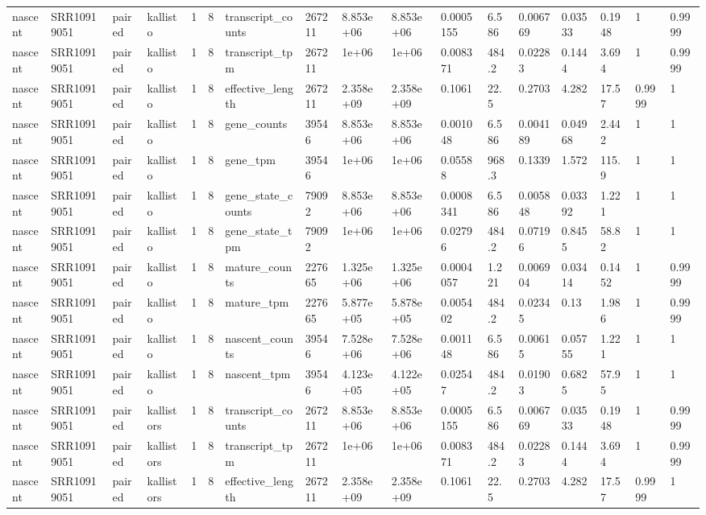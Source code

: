 \begin{tabular}{lllllllllllllllll}
nascent & SRR10919051 & paired & kallisto & 1 & 8 & transcript\_counts & 267211 & 8.853e+06 & 8.853e+06 & 0.0005155 & 6.586 & 0.006769 & 0.03533 & 0.1948 & 1 & 0.9999 \\
nascent & SRR10919051 & paired & kallisto & 1 & 8 & transcript\_tpm & 267211 & 1e+06 & 1e+06 & 0.008371 & 484.2 & 0.02283 & 0.1444 & 3.694 & 1 & 0.9999 \\
nascent & SRR10919051 & paired & kallisto & 1 & 8 & effective\_length & 267211 & 2.358e+09 & 2.358e+09 & 0.1061 & 22.5 & 0.2703 & 4.282 & 17.57 & 0.9999 & 1 \\
nascent & SRR10919051 & paired & kallisto & 1 & 8 & gene\_counts & 39546 & 8.853e+06 & 8.853e+06 & 0.001048 & 6.586 & 0.004189 & 0.04968 & 2.442 & 1 & 1 \\
nascent & SRR10919051 & paired & kallisto & 1 & 8 & gene\_tpm & 39546 & 1e+06 & 1e+06 & 0.05588 & 968.3 & 0.1339 & 1.572 & 115.9 & 1 & 1 \\
nascent & SRR10919051 & paired & kallisto & 1 & 8 & gene\_state\_counts & 79092 & 8.853e+06 & 8.853e+06 & 0.0008341 & 6.586 & 0.005848 & 0.03392 & 1.221 & 1 & 1 \\
nascent & SRR10919051 & paired & kallisto & 1 & 8 & gene\_state\_tpm & 79092 & 1e+06 & 1e+06 & 0.02796 & 484.2 & 0.07196 & 0.8455 & 58.82 & 1 & 1 \\
nascent & SRR10919051 & paired & kallisto & 1 & 8 & mature\_counts & 227665 & 1.325e+06 & 1.325e+06 & 0.0004057 & 1.221 & 0.006904 & 0.03414 & 0.1452 & 1 & 0.9999 \\
nascent & SRR10919051 & paired & kallisto & 1 & 8 & mature\_tpm & 227665 & 5.877e+05 & 5.878e+05 & 0.005402 & 484.2 & 0.02345 & 0.13 & 1.986 & 1 & 0.9999 \\
nascent & SRR10919051 & paired & kallisto & 1 & 8 & nascent\_counts & 39546 & 7.528e+06 & 7.528e+06 & 0.001148 & 6.586 & 0.00615 & 0.05755 & 1.221 & 1 & 1 \\
nascent & SRR10919051 & paired & kallisto & 1 & 8 & nascent\_tpm & 39546 & 4.123e+05 & 4.122e+05 & 0.02547 & 484.2 & 0.01903 & 0.6825 & 57.95 & 1 & 1 \\
nascent & SRR10919051 & paired & kallistors & 1 & 8 & transcript\_counts & 267211 & 8.853e+06 & 8.853e+06 & 0.0005155 & 6.586 & 0.006769 & 0.03533 & 0.1948 & 1 & 0.9999 \\
nascent & SRR10919051 & paired & kallistors & 1 & 8 & transcript\_tpm & 267211 & 1e+06 & 1e+06 & 0.008371 & 484.2 & 0.02283 & 0.1444 & 3.694 & 1 & 0.9999 \\
nascent & SRR10919051 & paired & kallistors & 1 & 8 & effective\_length & 267211 & 2.358e+09 & 2.358e+09 & 0.1061 & 22.5 & 0.2703 & 4.282 & 17.57 & 0.9999 & 1 \\

\end{tabular}
